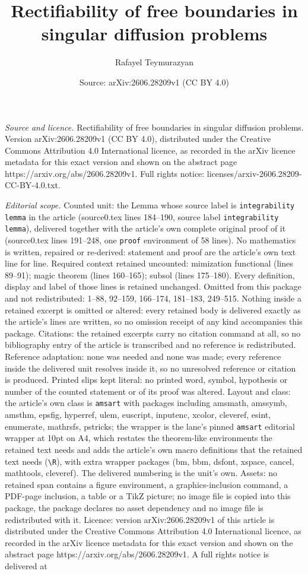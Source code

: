 \documentclass[10pt,a4paper]{amsart}
\title[Rectifiability of free boundaries in singular diffusion prob]{Rectifiability of free boundaries in singular diffusion problems}
\author{Rafayel Teymurazyan}
\date{Source: arXiv:2606.28209v1 (CC BY 4.0)}
\begin{document}
\maketitle

\noindent\emph{Source and licence.} Rectifiability of free boundaries in singular diffusion problems. Version arXiv:2606.28209v1 (CC BY 4.0), distributed under the Creative Commons Attribution 4.0 International licence, as recorded in the arXiv licence metadata for this exact version and shown on the abstract page https://arxiv.org/abs/2606.28209v1. Full rights notice: licenses/arxiv-2606.28209-CC-BY-4.0.txt.\par\smallskip

\noindent\textit{Editorial scope.} Counted unit: the Lemma whose source label is \texttt{integrability lemma} in the article (source0.tex lines 184--190, source label \texttt{integrability lemma}), delivered together with the article's own complete original proof of it (source0.tex lines 191--248, one \texttt{proof} environment of 58 lines). No mathematics is written, repaired or re-derived: statement and proof are the article's own text line for line. Required context retained uncounted: mimization functional (lines 89--91); magic theorem (lines 160--165); subsol (lines 175--180). Every definition, display and label of those lines is retained unchanged. Omitted from this package and not redistributed: 1--88, 92--159, 166--174, 181--183, 249--515. Nothing inside a retained excerpt is omitted or altered: every retained body is delivered exactly as the article's lines are written, so no omission receipt of any kind accompanies this package. Citations: the retained excerpts carry no citation command at all, so no bibliography entry of the article is transcribed and no reference is redistributed. Reference adaptation: none was needed and none was made; every reference inside the delivered unit resolves inside it, so no unresolved reference or citation is produced. Printed slips kept literal: no printed word, symbol, hypothesis or number of the counted statement or of its proof was altered. Layout and class: the article's own class is \texttt{amsart} with packages including amsmath, amssymb, amsthm, epsfig, hyperref, ulem, euscript, inputenc, xcolor, cleveref, esint, enumerate, mathrsfs, pstricks; the wrapper is the lane's pinned \texttt{amsart} editorial wrapper at 10pt on A4, which restates the theorem-like environments the retained text needs and adds the article's own macro definitions that the retained text needs (\texttt{\textbackslash R}), with extra wrapper packages (bm, bbm, dsfont, xspace, cancel, mathtools, cleveref). The delivered numbering is the unit's own. Assets: no retained span contains a figure environment, a graphics-inclusion command, a PDF-page inclusion, a table or a TikZ picture; no image file is copied into this package, the package declares no asset dependency and no image file is redistributed with it. Licence: version arXiv:2606.28209v1 of this article is distributed under the Creative Commons Attribution 4.0 International licence, as recorded in the arXiv licence metadata for this exact version and shown on the abstract page https://arxiv.org/abs/2606.28209v1. A full rights notice is delivered at 
\end{document}
